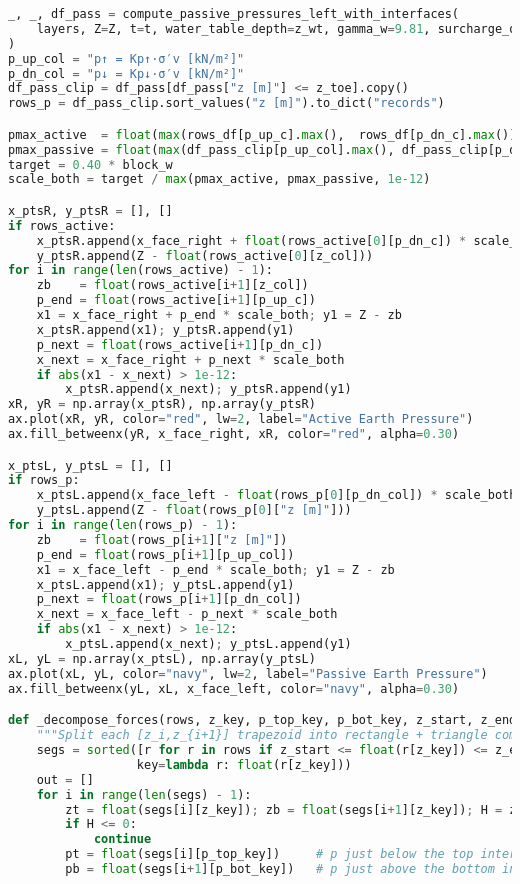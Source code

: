 \begin{lstlisting}[language=Python]
_, _, df_pass = compute_passive_pressures_left_with_interfaces(
    layers, Z=Z, t=t, water_table_depth=z_wt, gamma_w=9.81, surcharge_q=0.0
)
p_up_col = "p↑ = Kp↑·σ′v [kN/m²]"
p_dn_col = "p↓ = Kp↓·σ′v [kN/m²]"
df_pass_clip = df_pass[df_pass["z [m]"] <= z_toe].copy()
rows_p = df_pass_clip.sort_values("z [m]").to_dict("records")

pmax_active  = float(max(rows_df[p_up_c].max(),  rows_df[p_dn_c].max()))
pmax_passive = float(max(df_pass_clip[p_up_col].max(), df_pass_clip[p_dn_col].max()))
target = 0.40 * block_w
scale_both = target / max(pmax_active, pmax_passive, 1e-12)

x_ptsR, y_ptsR = [], []
if rows_active:
    x_ptsR.append(x_face_right + float(rows_active[0][p_dn_c]) * scale_both)
    y_ptsR.append(Z - float(rows_active[0][z_col]))
for i in range(len(rows_active) - 1):
    zb    = float(rows_active[i+1][z_col])
    p_end = float(rows_active[i+1][p_up_c])
    x1 = x_face_right + p_end * scale_both; y1 = Z - zb
    x_ptsR.append(x1); y_ptsR.append(y1)
    p_next = float(rows_active[i+1][p_dn_c])
    x_next = x_face_right + p_next * scale_both
    if abs(x1 - x_next) > 1e-12:
        x_ptsR.append(x_next); y_ptsR.append(y1)
xR, yR = np.array(x_ptsR), np.array(y_ptsR)
ax.plot(xR, yR, color="red", lw=2, label="Active Earth Pressure")
ax.fill_betweenx(yR, x_face_right, xR, color="red", alpha=0.30)

x_ptsL, y_ptsL = [], []
if rows_p:
    x_ptsL.append(x_face_left - float(rows_p[0][p_dn_col]) * scale_both)
    y_ptsL.append(Z - float(rows_p[0]["z [m]"]))
for i in range(len(rows_p) - 1):
    zb    = float(rows_p[i+1]["z [m]"])
    p_end = float(rows_p[i+1][p_up_col])
    x1 = x_face_left - p_end * scale_both; y1 = Z - zb
    x_ptsL.append(x1); y_ptsL.append(y1)
    p_next = float(rows_p[i+1][p_dn_col])
    x_next = x_face_left - p_next * scale_both
    if abs(x1 - x_next) > 1e-12:
        x_ptsL.append(x_next); y_ptsL.append(y1)
xL, yL = np.array(x_ptsL), np.array(y_ptsL)
ax.plot(xL, yL, color="navy", lw=2, label="Passive Earth Pressure")
ax.fill_betweenx(yL, xL, x_face_left, color="navy", alpha=0.30)

def _decompose_forces(rows, z_key, p_top_key, p_bot_key, z_start, z_end):
    """Split each [z_i,z_{i+1}] trapezoid into rectangle + triangle components."""
    segs = sorted([r for r in rows if z_start <= float(r[z_key]) <= z_end],
                  key=lambda r: float(r[z_key]))
    out = []
    for i in range(len(segs) - 1):
        zt = float(segs[i][z_key]); zb = float(segs[i+1][z_key]); H = zb - zt
        if H <= 0: 
            continue
        pt = float(segs[i][p_top_key])     # p just below the top interface
        pb = float(segs[i+1][p_bot_key])   # p just above the bottom interface


\end{lstlisting}
